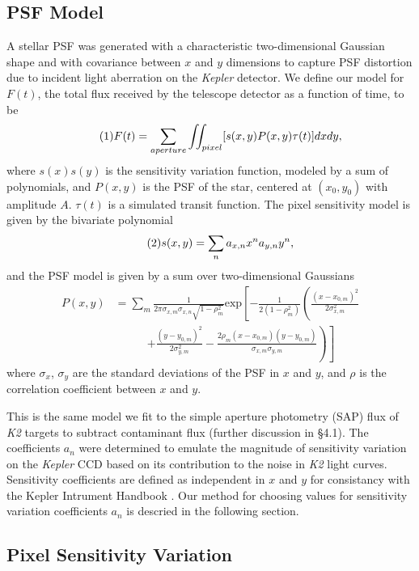 \documentclass[12pt,preprint]{aastex}
\begin{document}
\subsection{PSF Model}

A stellar PSF was generated with a characteristic two-dimensional Gaussian shape and with covariance between $x$ and $y$ dimensions to capture PSF distortion due to incident light aberration on the \textit{Kepler} detector. We define our model for $F(t)$, the total flux received by the telescope detector as a function of time, to be
%
\[
\tag{1}
F(t)=\sum_{aperture} \iint_{pixel} [s(x,y)P(x,y)\tau (t)]dxdy,\\
\]
%
where $s(x)s(y)$ is the sensitivity variation function, modeled by a sum of polynomials, and $P(x,y)$ is the PSF of the star, centered at $(x_0,y_0)$ with amplitude $A$. $\tau (t)$ is a simulated transit function. The pixel sensitivity model is given by the bivariate polynomial
%
\[
\tag{2}
s(x,y) = \sum_n a_{x,n}x^na_{y,n}y^n, \\
\]
%
and the PSF model is given by a sum over two-dimensional Gaussians
%
\[
\tag{3}
\begin{split}
P(x,y) & = \sum_m \frac{1}{2\pi\sigma_{x,m}\sigma_{x,n}\sqrt{1-\rho_m^2}} \text{exp}\left[ -\frac{1}{2(1-\rho_m^2)} \left( \frac{(x-x_{0,m})^2}{2\sigma_{x,m}^2} \right. \right. \\
			 & \phantom{xxxxx} \left. \left. + \frac{(y-y_{0,m})^2}{2\sigma_{y,m}^2} - \frac{2\rho_m  (x-x_{0,m})(y-y_{0,m})}{\sigma_{x,m}\sigma_{y,m}} \right) \right]
\end{split}
\]
%
where $\sigma_x$, $\sigma_y$ are the standard deviations of the PSF in $x$ and $y$, and $\rho$ is the correlation coefficient between $x$ and $y$.

This is the same model we fit to the simple aperture photometry (SAP) flux of \textit{K2} targets to subtract contaminant flux (further discussion in \S 4.1). The coefficients $a_n$ were determined to emulate the magnitude of sensitivity variation on the \textit{Kepler} CCD based on its contribution to the noise in \textit{K2} light curves. Sensitivity coefficients are defined as independent in $x$ and $y$ for consistancy with the Kepler Intrument Handbook \citep{kepler_intrument_handbook}. Our method for choosing values for sensitivity variation coefficients $a_n$ is descried in the following section.

\subsection{Pixel Sensitivity Variation}
\end{document}
